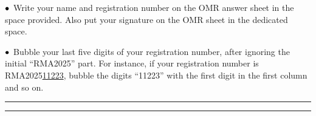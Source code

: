 \documentclass[a4paper,11pt]{article}
\def\iitem{$\bullet\kern4pt$}
\begin{document}
{\begin{minipage}{\textwidth}
\begin{minipage}[t]{.7\linewidth}
		\iitem Write your name and registration number on the OMR answer sheet in the space provided. Also put your signature on the OMR sheet in the dedicated space.
		
		\iitem Bubble your last five digits of your registration number, after ignoring the initial ``RMA2025'' part. For instance, if your registration number is RMA2025\underline{11223}, bubble the digits ``11223'' with the first digit in the first column and so on.
	\end{minipage}
\end{minipage}

\vspace*{1ex}\hrule\hrule

		
\begin{multicols}{2}
\AMCform
\end{multicols}

} %
\end{document}
